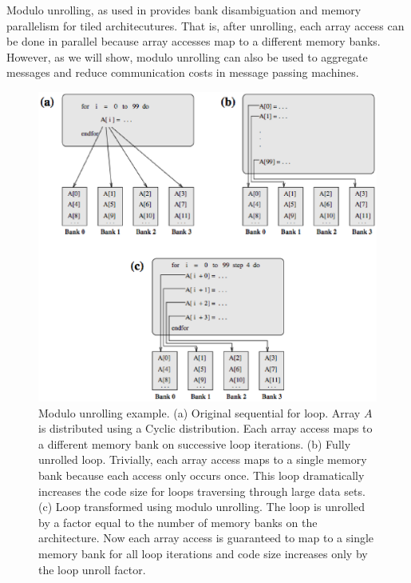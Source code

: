 Modulo unrolling, as used in \cite{barua1999maps} provides bank disambiguation and memory parallelism for tiled architecutures. That is, after unrolling, each array access can be done in parallel because array accesses map to a different memory banks. However, as we will show, modulo unrolling can also be used to aggregate messages and reduce communication costs in message passing machines. 

\begin{figure}
	\begin{center}
	\includegraphics[scale=0.55]{./Figures/modulo_unrolling.eps}
	\caption{Modulo unrolling example. (a) Original sequential for loop. Array $A$ is distributed using a Cyclic distribution. Each array access maps to a different memory bank on successive loop iterations. (b) Fully unrolled loop. Trivially, each array access maps to a single memory bank because each access only occurs once. This loop dramatically increases the code size for loops traversing through large data sets. (c) Loop transformed using modulo unrolling. The loop is unrolled by a factor equal to the number of memory banks on the architecture. Now each array access is guaranteed to map to a single memory bank for all loop iterations and code size increases only by the loop unroll factor.}
	\label{modulo_unrolling}
	\end{center}
\end{figure}
